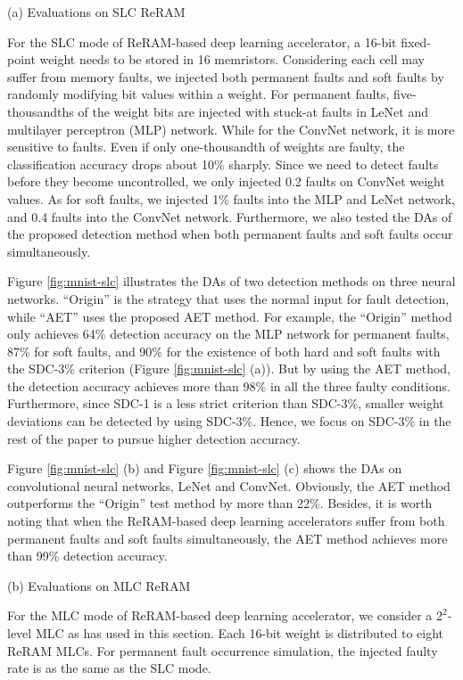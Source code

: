 (a) Evaluations on SLC ReRAM 

For the SLC mode of ReRAM-based deep learning accelerator,  a 16-bit fixed-point weight needs to be stored in 16 memristors. Considering each cell may suffer from memory faults, we injected both permanent faults and soft faults by randomly modifying bit values within a weight. 
For permanent faults,  five-thousandths of the weight bits are injected with stuck-at faults in LeNet and multilayer perceptron (MLP) network. While for the ConvNet network, it is more sensitive to faults. Even if only one-thousandth of weights are faulty,  the classification accuracy drops about 10\% sharply. Since we need to detect faults before they become uncontrolled, we only injected {0.2\textperthousand} faults on ConvNet weight values. As for soft faults, we injected 1\% faults into the MLP and LeNet network, and {0.4\textperthousand} faults into the ConvNet network. Furthermore, we also tested the DAs of the proposed detection method when both permanent faults and soft faults occur simultaneously.

Figure \ref{fig:mnist-slc} illustrates the DAs of two detection methods on three neural networks. ``Origin'' is the strategy that uses the normal input for fault detection, while ``AET'' uses the proposed AET method. For example, the ``Origin'' method only achieves 64\% detection accuracy on the MLP network for permanent faults, 87\% for soft faults, and 90\% for the existence of both hard and soft faults with the SDC-3\% criterion (Figure \ref{fig:mnist-slc} (a)). But by using the AET method, the detection accuracy achieves more than 98\% in all the three faulty conditions.  Furthermore, since SDC-1 is a less strict criterion than SDC-3\%, smaller weight deviations can be detected by using SDC-3\%. Hence, we focus on SDC-3\% in the rest of the paper to pursue higher detection accuracy. 

Figure \ref{fig:mnist-slc} (b) and Figure \ref{fig:mnist-slc} (c) shows the DAs on convolutional neural networks, LeNet and ConvNet. Obviously,  the AET method outperforms the ``Origin'' test method by more than 22\%. Besides, it is worth noting that when the ReRAM-based deep learning accelerators suffer from both permanent faults and soft faults simultaneously, the AET method achieves more than 99\% detection accuracy.

(b) Evaluations on MLC ReRAM

For the MLC mode of ReRAM-based deep learning accelerator, we consider a $2^2$-level MLC as  \cite{7551379} has used in this section. Each 16-bit weight is distributed to eight ReRAM MLCs. For permanent fault occurrence simulation, the injected faulty rate is as the same as the SLC mode.

